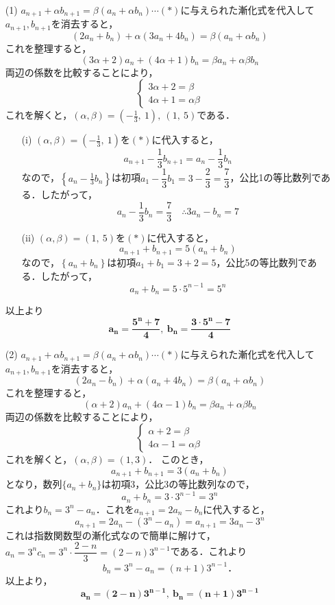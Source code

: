 \documentclass[a4paper,11pt]{ltjsarticle}
\begin{document}
\begin{itemize}
    \item [(1)]$a_{n+1}+\alpha b_{n+1}=\beta(a_n+\alpha b_n)\cdots(\ast)$に与えられた漸化式を代入して$a_{n+1},b_{n+1}$を消去すると，
\[(2a_n+b_n)+\alpha(3a_n+4b_n)=\beta(a_n+\alpha b_n)\]
これを整理すると，
\[(3\alpha+2)a_n+(4\alpha+1)b_n=\beta a_n+\alpha\beta b_n\]
両辺の係数を比較することにより，
\[\begin{cases}
  3\alpha+2=\beta\\
  4\alpha+1=\alpha\beta
\end{cases}\]
これを解くと，$\displaystyle{(\alpha,\beta)=\left(-\frac13,~1\right),~(1,~5)}$である．
\begin{itemize}
    \item[(i)]$\displaystyle{(\alpha,\beta)=\left(-\frac13,~1\right)}$を$(\ast)$に代入すると，
\[a_{n+1}-\frac13 b_{n+1}=a_n-\frac13 b_n\]
なので，$\displaystyle{\left\{a_n-\frac13 b_n\right\}}$は初項$a_1-\dfrac13 b_1=3-\dfrac23=\dfrac73$，公比1の等比数列である．したがって，
\[a_n-\frac13b_n=\frac73 \quad \therefore 3a_n-b_n=7 \]
    \item[(ii)]$\displaystyle{(\alpha,\beta)=(1,~5)}$を$(\ast)$に代入すると，
\[a_{n+1}+ b_{n+1}=5\left(a_n+ b_n\right)\]
なので，$\displaystyle{\left\{a_n+ b_n\right\}}$は初項$a_1+ b_1=3+2=5$，公比5の等比数列である．したがって，
\[a_n+b_n=5\cdot5^{n-1}=5^n \]
\end{itemize}
以上より
\[\boldsymbol{a_{n}=\frac{5^n+7}{4},~b_n=\frac{3\cdot5^n-7}{4}}\]
    \item [(2)] $a_{n+1}+\alpha b_{n+1}=\beta(a_n+\alpha b_n)\cdots(\ast)$に与えられた漸化式を代入して$a_{n+1},b_{n+1}$を消去すると，
\[(2a_n-b_n)+\alpha(a_n+4b_n)=\beta(a_n+\alpha b_n)\]
これを整理すると，
\[(\alpha+2)a_n+(4\alpha-1)b_n=\beta a_n+\alpha\beta b_n\]
両辺の係数を比較することにより，
\[\begin{cases}
  \alpha+2=\beta\\
  4\alpha-1=\alpha\beta
\end{cases}\]
これを解くと，$(\alpha,\beta)=(1,3)$．
このとき，
\[a_{n+1}+b_{n+1}=3(a_n+b_n)\]
となり，数列$\{a_n+b_n\}$は初項$3$，公比3の等比数列なので，
\[a_n+b_n=3\cdot3^{n-1}=3^n\]
これより$b_n=3^n-a_n$．これを$a_{n+1}=2a_n-b_n$に代入すると，
\[a_{n+1}=2a_n-(3^n-a_n) = a_{n+1}=3a_n-3^n\]
これは指数関数型の漸化式なので簡単に解けて，$a_n=3^n c_n=3^n\cdot\dfrac{2-n}{3}=(2-n)3^{n-1}$である．これより
\[b_n=3^n-a_n=(n+1)3^{n-1}．\]
以上より，\[\boldsymbol{a_n=(2-n)3^{n-1},~b_n=(n+1)3^{n-1}}\]
\end{itemize}
\end{document}
